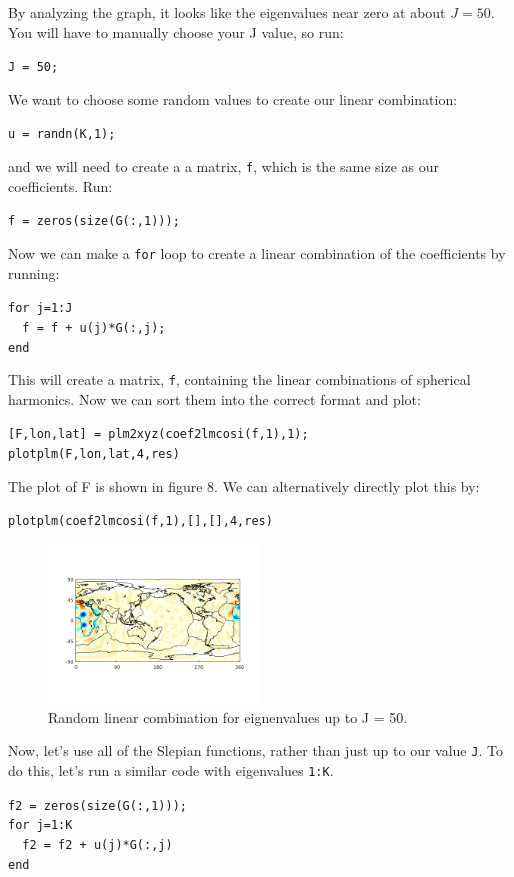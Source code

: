 \documentclass[11pt]{article}
\begin{document}
By analyzing the graph, it looks like the eigenvalues near zero at about $J=50$.  You will have to manually choose your J value, so run:

\verb+J = 50;+

We want to choose some random values to create our linear combination:

\verb|u = randn(K,1);|

and we will need to create a a matrix, \verb+f+, which is the same size as our coefficients. Run:

\verb|f = zeros(size(G(:,1)));|

Now we can make a \verb|for| loop to create a linear combination of the coefficients by running:

\verb|for j=1:J|\\
\verb|	f = f + u(j)*G(:,j);|\\
\verb|end|

This will create a matrix, \verb|f|, containing the linear combinations of spherical harmonics.  Now we can sort them into the correct format and plot:

\verb|[F,lon,lat] = plm2xyz(coef2lmcosi(f,1),1);|\\
\verb|plotplm(F,lon,lat,4,res)|

The plot of F is shown in figure 8.  We can alternatively directly plot this by:

\verb|plotplm(coef2lmcosi(f,1),[],[],4,res)|

\begin{figure}[H]
	\centering
	\includegraphics[width=0.5\textwidth]{figures/F_ml.png}
	\caption{Random linear combination for eignenvalues up to J = 50.}
\end{figure}


Now, let's use all of the Slepian functions, rather than just up to our value \verb|J|.  To do this, let's run a similar code with eigenvalues \verb|1:K|.

\verb|f2 = zeros(size(G(:,1)));|\\
\verb|for j=1:K|\\
\verb|	f2 = f2 + u(j)*G(:,j)|\\
\verb|end|
\end{document}
